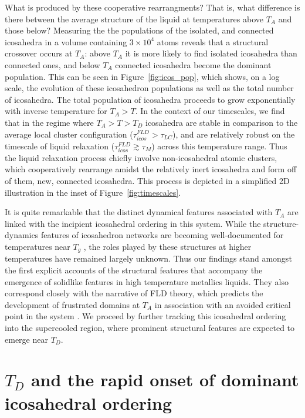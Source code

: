 \documentclass[aps,prl,preprint,showpacs,amsmath,floatfix,superscriptaddress]{revtex4}
\begin{document}
What is produced by these cooperative rearrangments? That is, what
difference is there between the average structure of the liquid at
temperatures above $T_{A}$ and those below? Measuring the the
populations of the isolated, and connected icosahedra in a volume
containing $3\times 10^{4}$ atoms reveals that a structural
crossover occurs at $T_{A}$: above $T_{A}$ it is more likely to
find isolated icosahedra than connected ones, and below $T_{A}$
connected icosahedra become the dominant population. This can be
seen in Figure~\ref{fig:icos_pop}, which shows, on a log scale,
the evolution of these icosahedron populations as well as the
total number of icosahedra. The total population of icosahedra
proceeds to grow exponentially with inverse temperature for $T_{A}
> T$. In the context of our timescales, we find that in the regime
where $T_{A} > T > T_{D}$ icosahedra are stable in comparison to
the average local cluster configuration ($\tau^{FLD}_{icos} >
\tau_{LC}$), and are relatively robust on the timescale of liquid
relaxation ($\tau^{FLD}_{icos} \gtrsim \tau_{M}$) across this
temperature range. Thus the liquid relaxation process chiefly
involve non-icosahedral atomic clusters, which cooperatively
rearrange amidst the relatively inert icosahedra and form off of
them, new, connected icosahedra. This process is depicted in a
simplified 2D illustration in the inset of
Figure~\ref{fig:timescales}.

It is quite remarkable that the distinct dynamical features
associated with $T_{A}$ are linked with the incipient icosahedral
ordering in this system. While the structure-dynamics features of
icosahedron networks are becoming well-documented for temperatures
near $T_{g}$ \cite{Cheng2008,Ding2014,Mendelev2015}, the roles
played by these structures at higher temperatures have remained
largely unknown. Thus our findings stand amongst the first
explicit accounts of the structural features that accompany the
emergence of solidlike features in high temperature metallics
liquids. They also correspond closely with the narrative of FLD
theory, which predicts the development of frustrated domains at
$T_{A}$ in association with an avoided critical point in the
system \cite{Tarjus2005, Kivelson1995, Nussinov2004}. We proceed
by further tracking this icosahedral ordering into the supercooled
region, where prominent structural features are expected to emerge
near $T_{D}$.

\section{$T_{D}$ and the rapid onset of dominant icosahedral ordering}
\end{document}
